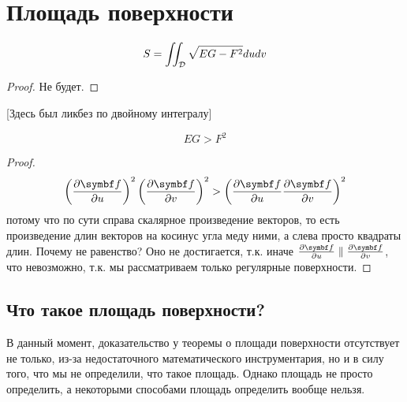 \documentclass[main]{subfiles}
\begin{document}
\chapter{Площадь поверхности}
\begin{theorem}
    \[S = \iint_{\mathcal{D}} \sqrt{EG - F^2} dudv\]
\end{theorem}
\begin{proof}
    Не будет.
\end{proof}
[Здесь был ликбез по двойному интегралу]
\begin{theorem}
    \[EG > F^2\]
\end{theorem}
\begin{proof}
    \[\left( \frac{\partial \vf}{\partial u}\right)^2 \left( \frac{\partial \vf}{\partial v}\right)^2 > \left(\frac{\partial \vf}{\partial u}\frac{\partial \vf}{\partial v}\right)^2\]
    потому что по сути справа скалярное произведение векторов, то есть произведение длин векторов на косинус угла меду ними, а слева просто квадраты длин.
    Почему не равенство? Оно не достигается, т.к. иначе $\frac{\partial \vf}{\partial u} \parallel \frac{\partial \vf}{\partial v}$, что невозможно, т.к. мы рассматриваем только регулярные поверхности.
\end{proof}

\section{Что такое площадь поверхности?}
В данный момент, доказательство у теоремы о площади поверхности отсутствует не только,
из-за недостаточного математического инструментария, но и в силу того, что мы не определили, что такое площадь.
Однако площадь не просто определить, а некоторыми способами площадь определить вообще нельзя.
\end{document}
